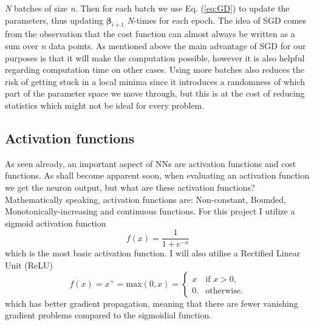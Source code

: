 \documentclass[14pt, a4paper]{book}
\begin{document}
\textit{N} batches of size \textit{n}. Then for each batch we use Eq. (\ref{eq:GD}) to update the parameters, thus updating $\bm{\beta}_{i+1}$ \textit{N}-times for each epoch. The idea of SGD comes from the observation that the 
cost function can almost always be written as a sum over \textit{n} data points. As mentioned above the main advantage of SGD for our purposes is that it will make the computation possible, however it is also helpful regarding 
computation time on other cases. Using more batches also reduces the risk of getting stuck in a local minima since it introduces a randomness of which part of the parameter space we move through, 
but this is at the cost of reducing statistics which might not be ideal for every problem.


\subsection{Activation functions}
As seen already, an important aspect of NNs are activation functions and cost functions. As shall become apparent soon, when evaluating an activation function we get the neuron output, but what are these activation functions? 
Mathematically speaking, activation functions are: Non-constant, Bounded, Monotonically-increasing and continuous functions. For this project I utilize a sigmoid activation function
\begin{equation}\label{eq:sig}
    f(x) = \frac{1}{1+e^{-x}}
\end{equation}
which is the most basic activation function. I will also utilise a Rectified Linear Unit (ReLU)
\begin{equation}\label{eq:ReLU}
    f(x) = x^+ = \text{max}(0,x) = \begin{cases}x&{\text{if }}x>0,\\0.&{\text{otherwise}}.\end{cases}
\end{equation}
which has better gradient propagation, meaning that there are fewer vanishing gradient problems compared to the sigmoidial function.
\end{document}
